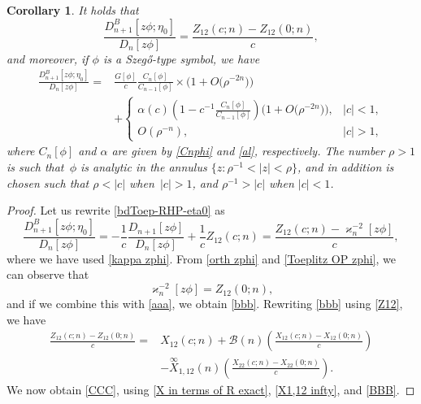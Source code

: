 \documentclass[pdftex]{sigma}
\numberwithin{equation}{section}
\newtheorem{Corollary}[Theorem]{Corollary}
\newcommand{\al}{\alpha}
\newcommand{\di}{\displaystyle}
\begin{document}
		\begin{Corollary}\label{Corollary zphi/z-c}
			It holds that
			\begin{equation}\label{bbb}
				\frac{D^{B}_{n+1}[z\phi;\eta_0]}{D_{n}[z\phi]} = \frac{Z_{12}(c;n) - Z_{12}(0;n)}{c},
			\end{equation}
			and moreover, if $\phi$ is a Szeg\H{o}-type symbol, we have
			\begin{align}
					\frac{D^{B}_{n+1}[z\phi;\eta_0]}{D_{n}[z\phi]} ={}& \di \frac{G[\phi]}{c} \frac{C_n[\phi]}{C_{n-1}[\phi]} \times \big(1 + O\big(\rho^{-2n}\big)\big)\nonumber \\
 & + \begin{cases}
						\al(c)\left(	1 - \di c^{-1} \frac{C_n[\phi]}{C_{n-1}[\phi]} \right) \big(1 + O\big(\rho^{-2n}\big)\big), & |c|<1, \\
						O(\rho^{-n})	, & |c|>1,
					\end{cases}\label{CCC}
			\end{align}
			where $C_n[\phi]$ and
			$\al$ are given by \eqref{Cnphi} and \eqref{al}, respectively. The number $\rho>1$ is such that~$\phi$ is analytic in the annulus $\big\{z\colon \rho^{-1}<|z|<\rho\big\}$, and in addition is chosen such that $\rho < |c|$ when~${|c|>1}$, and $\rho^{-1} > |c|$ when $|c|<1$.
		\end{Corollary}
		\begin{proof}
			Let us rewrite \eqref{bdToep-RHP-eta0} as
			\begin{equation}\label{aaa}
				\frac{D^{B}_{n+1}[z\phi;\eta_0]}{D_{n}[z\phi]} = - \frac{1}{c} \frac{D_{n+1}[z\phi]}{D_{n}[z\phi]} + \frac{1}{c} Z_{12}(c;n) = \frac{Z_{12}(c;n)-\varkappa_n^{-2}[z\phi]}{c},
			\end{equation}
			where we have used \eqref{kappa zphi}. From \eqref{orth zphi} and \eqref{Toeplitz OP zphi}, we can observe that
			\begin{equation*}
				\varkappa_n^{-2}[z\phi] = Z_{12}(0;n),
			\end{equation*}
			and if we combine this with \eqref{aaa}, we obtain \eqref{bbb}. Rewriting \eqref{bbb}
			using \eqref{Z12}, we have
			\begin{align*}
				\frac{Z_{12}(c;n) - Z_{12}(0;n)}{c} ={}& X_{12}(c;n) + \mathscr{B}(n) \left( \frac{X_{12}(c;n) - X_{12}(0;n)}{c} \right) \\ & -\overset{\infty}{X}_{1,12}(n) \left( \frac{X_{22}(c;n) - X_{22}(0;n)}{c} \right).
			\end{align*}
			We now obtain \eqref{CCC}, using \eqref{X in terms of R exact}, \eqref{X1,12 infty}, and \eqref{BBB}.
		\end{proof}
		
\end{document}
